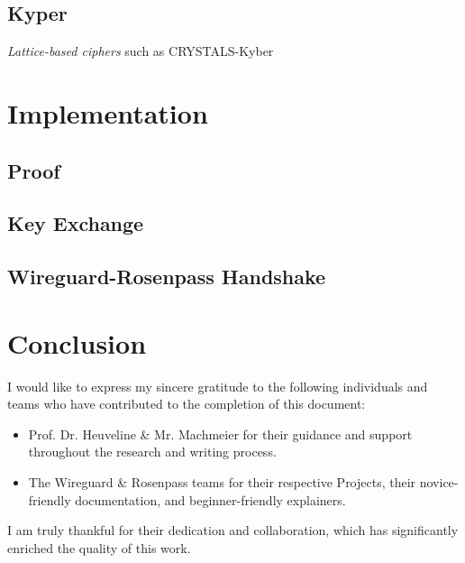 \documentclass[sigconf]{acmart}
\begin{document}

\subsection{Kyper}
\textit{Lattice-based ciphers} such as CRYSTALS-Kyber


\section{Implementation}

\subsection{Proof}

\subsection{Key Exchange}

\subsection{Wireguard-Rosenpass Handshake}


\section{Conclusion}


\begin{acks}
I would like to express my sincere gratitude to the following individuals and teams who have contributed to the completion of this document:

\begin{itemize}
  \item Prof. Dr. Heuveline \& Mr. Machmeier for their guidance and support throughout the research and writing process.
  \item The Wireguard \& Rosenpass teams for their respective Projects, their novice-friendly documentation, and beginner-friendly explainers.
\end{itemize}

I am truly thankful for their dedication and collaboration, which has significantly enriched the quality of this work.
\end{acks}
\end{document}
